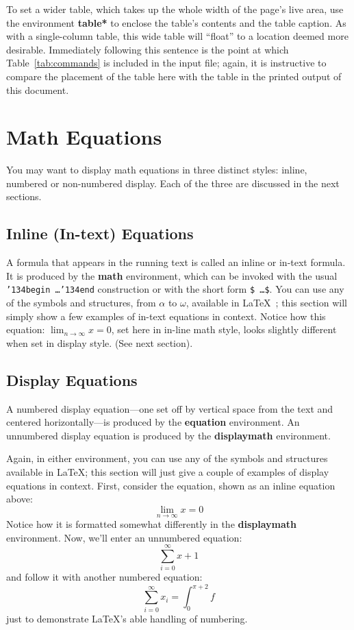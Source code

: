 \documentclass[sigplan,screen]{acmart}
\begin{document}
To set a wider table, which takes up the whole width of the page's
live area, use the environment \textbf{table*} to enclose the table's
contents and the table caption.  As with a single-column table, this
wide table will ``float'' to a location deemed more
desirable. Immediately following this sentence is the point at which
Table~\ref{tab:commands} is included in the input file; again, it is
instructive to compare the placement of the table here with the table
in the printed output of this document.

\section{Math Equations}
You may want to display math equations in three distinct styles:
inline, numbered or non-numbered display.  Each of the three are
discussed in the next sections.

\subsection{Inline (In-text) Equations}
A formula that appears in the running text is called an inline or
in-text formula.  It is produced by the \textbf{math} environment,
which can be invoked with the usual
\texttt{{\char'134}begin\,\ldots{\char'134}end} construction or with
the short form \texttt{\$\,\ldots\$}. You can use any of the symbols
and structures, from $\alpha$ to $\omega$, available in
\LaTeX~\cite{Lamport:LaTeX}; this section will simply show a few
examples of in-text equations in context. Notice how this equation:
\begin{math}
  \lim_{n\rightarrow \infty}x=0
\end{math},
set here in in-line math style, looks slightly different when
set in display style.  (See next section).

\subsection{Display Equations}
A numbered display equation---one set off by vertical space from the
text and centered horizontally---is produced by the \textbf{equation}
environment. An unnumbered display equation is produced by the
\textbf{displaymath} environment.

Again, in either environment, you can use any of the symbols and
structures available in \LaTeX\@; this section will just give a couple
of examples of display equations in context.  First, consider the
equation, shown as an inline equation above:
\begin{equation}
  \lim_{n\rightarrow \infty}x=0
\end{equation}
Notice how it is formatted somewhat differently in
the \textbf{displaymath}
environment.  Now, we'll enter an unnumbered equation:
\begin{displaymath}
  \sum_{i=0}^{\infty} x + 1
\end{displaymath}
and follow it with another numbered equation:
\begin{equation}
  \sum_{i=0}^{\infty}x_i=\int_{0}^{\pi+2} f
\end{equation}
just to demonstrate \LaTeX's able handling of numbering.
\end{document}
